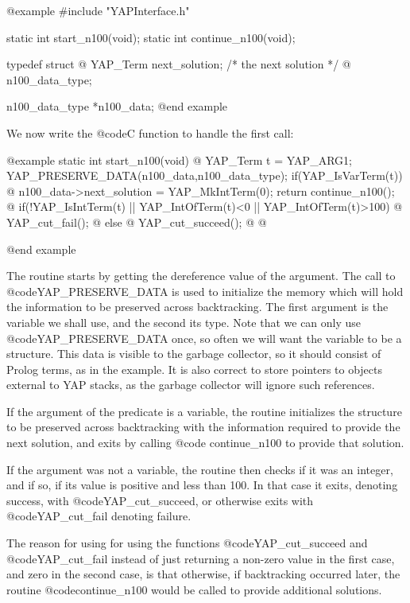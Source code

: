 {{{{{{{{{@example
#include "YAPInterface.h"

static int start_n100(void);
static int continue_n100(void);

typedef struct @{
    YAP_Term next_solution;  /* the next solution */
   @} n100_data_type;

n100_data_type *n100_data;
@end example

We now write the @code{C} function to handle the first call:

@example
static int start_n100(void)
@{
      YAP_Term t = YAP_ARG1;
      YAP_PRESERVE_DATA(n100_data,n100_data_type);
      if(YAP_IsVarTerm(t)) @{
          n100_data->next_solution = YAP_MkIntTerm(0);
          return continue_n100();
       @}
      if(!YAP_IsIntTerm(t) || YAP_IntOfTerm(t)<0 || YAP_IntOfTerm(t)>100) @{
          YAP_cut_fail();
      @} else @{
          YAP_cut_succeed();
      @}
@}

@end example

The routine starts by getting the dereference value of the argument.
The call to @code{YAP_PRESERVE_DATA} is used to initialize the memory
which will hold the information to be preserved across
backtracking. The first argument is the variable we shall use, and the
second its type. Note that we can only use @code{YAP_PRESERVE_DATA}
once, so often we will want the variable to be a structure. This data
is visible to the garbage collector, so it should consist of Prolog
terms, as in the example. It is also correct to store pointers to
objects external to YAP stacks, as the garbage collector will ignore
such references.

If the argument of the predicate is a variable, the routine initializes the 
structure to be preserved across backtracking with the information
required to provide the next solution, and exits by calling @code{
continue_n100} to provide that solution.

If the argument was not a variable, the routine then checks if it was an
integer, and if so, if its value is positive and less than 100. In that
case it exits, denoting success, with @code{YAP_cut_succeed}, or
otherwise exits with @code{YAP_cut_fail} denoting failure.

The reason for using for using the functions @code{YAP_cut_succeed} and
@code{YAP_cut_fail} instead of just returning a non-zero value in the
first case, and zero in the second case, is that otherwise, if
backtracking occurred later, the routine @code{continue_n100} would be
called to provide additional solutions.

}}}}}}}}}
